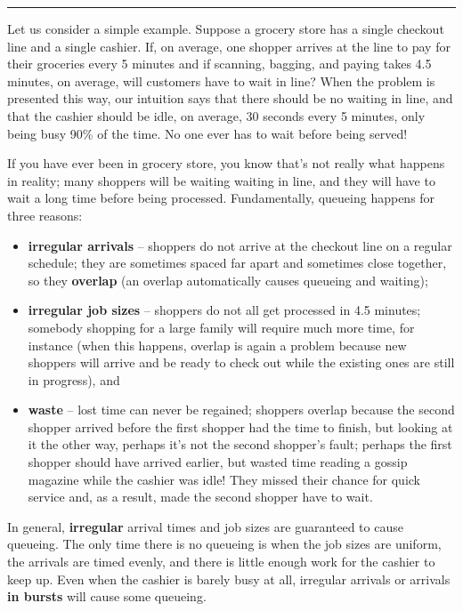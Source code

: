 \begin{center}
    \rule{0.5\textwidth}{.4pt}
\end{center}
Let us consider a simple example. Suppose a grocery store has a single checkout line and a single cashier. If, on average, one shopper arrives at the line to pay for their groceries every 5 minutes and if scanning, bagging, and paying takes 4.5 minutes, on average, will customers have to wait in line? When the problem is presented this way, our intuition says that there should be no waiting in line, and that the cashier should be idle, on average, 30 seconds every 5 minutes, only being busy 90\% of the time. No one ever has to wait before being served! \par If you have ever been in grocery store, you know that's not really what happens in reality; many shoppers will be waiting waiting in line, and they will have to wait a long time before being processed. Fundamentally, queueing happens for three reasons:
  \begin{itemize}[noitemsep]
 \item \textbf{irregular arrivals} -- shoppers do not arrive at the checkout line on a regular schedule; they are sometimes spaced far apart and sometimes close together, so they \textbf{overlap} (an overlap automatically causes queueing and waiting);
 \item \textbf{irregular job sizes} -- shoppers do not all get processed in 4.5 minutes; somebody shopping for a large family will require much more time, for instance (when this happens, overlap is again a problem because new shoppers will arrive and be ready to check out while the existing ones are still in progress), and  
\item \textbf{waste} -- lost time can never be regained; shoppers overlap because the second shopper arrived before the first shopper had the time to finish, but looking at it the other way, perhaps it's not the second shopper's fault; perhaps the first shopper should have arrived earlier, but wasted time reading a gossip magazine while the cashier was idle! They missed their chance for quick service and, as a result,  made the second shopper have to wait.
\end{itemize}
In general, \textbf{irregular} arrival times and job sizes are guaranteed to cause queueing. The only time there is no queueing is when the job sizes are uniform, the arrivals are timed evenly, and there is little enough work for the cashier to keep up. Even when the cashier is barely busy at all, irregular arrivals or arrivals \textbf{in bursts} will cause some queueing.

